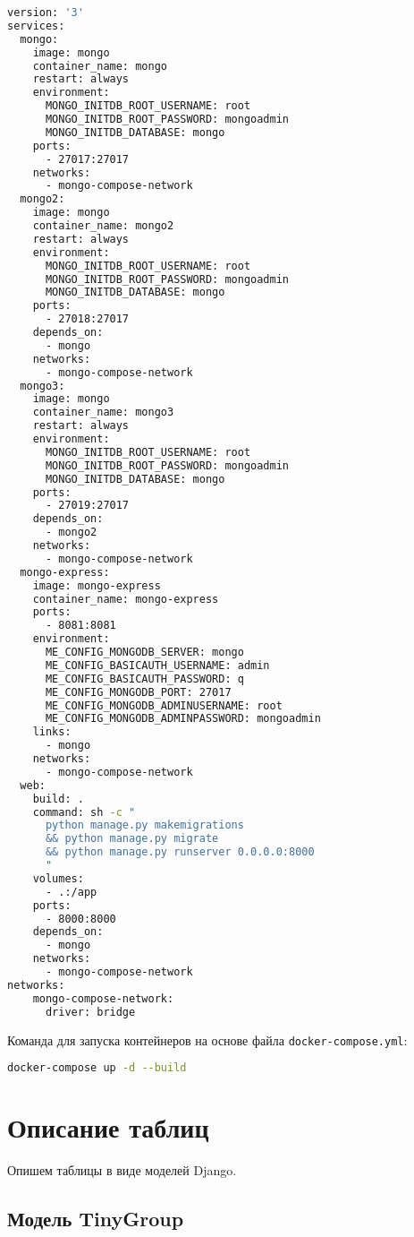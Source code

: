 \begin{lstlisting}[language=bash]
version: '3'
services:
  mongo:
    image: mongo
    container_name: mongo
    restart: always
    environment:
      MONGO_INITDB_ROOT_USERNAME: root
      MONGO_INITDB_ROOT_PASSWORD: mongoadmin
      MONGO_INITDB_DATABASE: mongo
    ports:
      - 27017:27017
    networks:
      - mongo-compose-network
  mongo2:
    image: mongo
    container_name: mongo2
    restart: always
    environment:
      MONGO_INITDB_ROOT_USERNAME: root
      MONGO_INITDB_ROOT_PASSWORD: mongoadmin
      MONGO_INITDB_DATABASE: mongo
    ports:
      - 27018:27017
    depends_on:
      - mongo
    networks:
      - mongo-compose-network
  mongo3:
    image: mongo
    container_name: mongo3
    restart: always
    environment:
      MONGO_INITDB_ROOT_USERNAME: root
      MONGO_INITDB_ROOT_PASSWORD: mongoadmin
      MONGO_INITDB_DATABASE: mongo
    ports:
      - 27019:27017
    depends_on:
      - mongo2
    networks:
      - mongo-compose-network
  mongo-express:
    image: mongo-express
    container_name: mongo-express
    ports:
      - 8081:8081
    environment:
      ME_CONFIG_MONGODB_SERVER: mongo
      ME_CONFIG_BASICAUTH_USERNAME: admin
      ME_CONFIG_BASICAUTH_PASSWORD: q
      ME_CONFIG_MONGODB_PORT: 27017
      ME_CONFIG_MONGODB_ADMINUSERNAME: root
      ME_CONFIG_MONGODB_ADMINPASSWORD: mongoadmin
    links:
      - mongo
    networks:
      - mongo-compose-network
  web:
    build: .
    command: sh -c "
      python manage.py makemigrations
      && python manage.py migrate
      && python manage.py runserver 0.0.0.0:8000
      "
    volumes:
      - .:/app
    ports:
      - 8000:8000
    depends_on:
      - mongo
    networks:
      - mongo-compose-network
networks:
    mongo-compose-network:
      driver: bridge
\end{lstlisting}

Команда для запуска контейнеров на основе файла \texttt{docker-compose.yml}:

\begin{lstlisting}[language=bash]
docker-compose up -d --build
\end{lstlisting}

\section{Описание таблиц}

Опишем таблицы в виде моделей Django.

\subsection{Модель TinyGroup}

